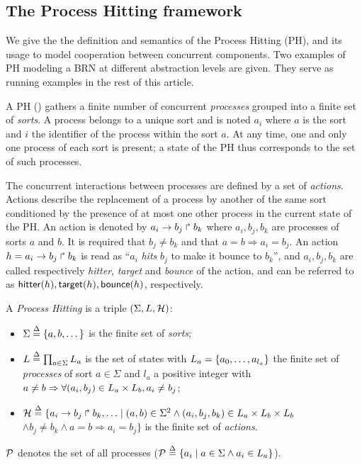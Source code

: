 \subsection{The Process Hitting framework}
\label{ssec:PH}

We give the the definition and semantics of the Process Hitting (PH), and its usage to model
cooperation between concurrent components.
Two examples of PH modeling a BRN at different abstraction levels are given.
They serve as running examples in the rest of this article.

\medskip

A PH () gathers a finite number of concurrent \emph{processes}
grouped into a finite set of \emph{sorts}.
A process belongs to a unique sort and is noted $a_i$ where $a$ is the
sort and $i$ the identifier of the process within the sort $a$.
At any time, one and only one process of each sort is present; a state of the PH thus corresponds to the set of such processes.
 
The concurrent interactions between processes are defined by a set of
\emph{actions}.
Actions describe the replacement of a process by another of the same sort
conditioned by the presence of at most one other process in the current
state of the PH.
An action is denoted by $a_i\rightarrow b_j\Rsh b_k$ where $a_i,b_j,b_k$ are processes
of sorts $a$ and $b$.
It is required that $b_j\neq b_k$ and that $a=b\Rightarrow a_i=b_j$.
An action $h=a_i\rightarrow b_j\Rsh b_k$ is read as ``$a_i$ \emph{hits} $b_j$ to
make it bounce to $b_k$'', and
$a_i,b_j,b_k$ are called respectively \emph{hitter}, \emph{target} and
\emph{bounce} of the action, and can be referred to as
$\mathsf{hitter}(h), \mathsf{target}(h), \mathsf{bounce}(h)$, respectively.

\begin{definition}\label{def:PH}
A \emph{Process Hitting} is a triple $(\Sigma,L,\mathcal{H})$:
\begin{itemize}
\item $\Sigma \stackrel{\Delta}= \{a,b,\dots\}$ is the finite set of \emph{sorts};
\item $L \stackrel{\Delta}= \prod_{a\in\Sigma} L_a$ is the set of states with $L_a = \{a_0,\dots,a_{l_a}\}$
the finite set of \emph{processes} of sort $a\in\Sigma$ and $l_a$ a positive integer with
	$a\neq b\Rightarrow \forall(a_i,b_j)\in L_a\times L_b,a_i\neq b_j$;
\item $\mathcal{H} \stackrel{\Delta}= \{ a_i\rightarrow b_j\Rsh b_k, \ldots \mid
					(a,b)\in\Sigma^2 \wedge (a_i,b_j,b_k)\in L_a\times L_b\times L_b$ \\
	\hspace*{2cm} $\wedge b_j\neq b_k \wedge a=b\Rightarrow a_i=b_j\}$
			is the finite set of \emph{actions}.
\end{itemize}
$\mathcal{P}$ denotes the set of all processes ($\mathcal{P} \stackrel{\Delta}= \{ a_i\mid a\in\Sigma \wedge a_i\in L_a\}$).
\end{definition}

